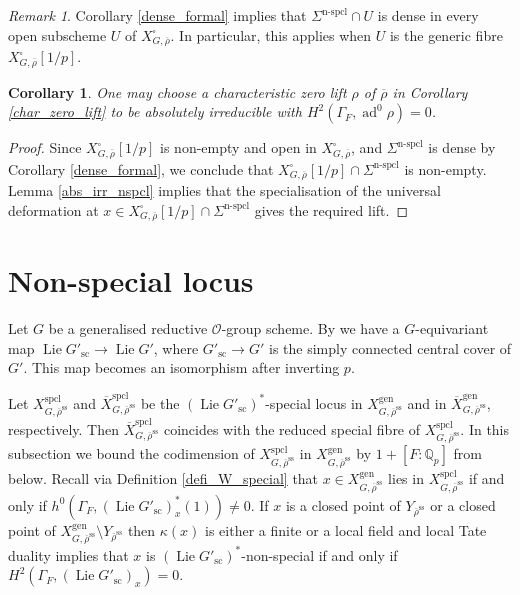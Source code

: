 \documentclass{amsart}
\newtheorem{cor}[prop]{Corollary}
\theoremstyle{definition}
\theoremstyle{remark}
\newtheorem{remar}[prop]{Remark}
\newcommand{\Qp}{\mathbb {Q}_p}
\newcommand{\OO}{\mathcal O}
\DeclareMathOperator{\ad}{ad}
\newcommand{\rhobar}{\overline{\rho}}
\newcommand{\gen}{\mathrm{gen}}
\newcommand{\Xbar}{\overline{X}}
\DeclareMathOperator{\spcl}{spcl}
\DeclareMathOperator{\nspcl}{n-spcl}
\DeclareMathOperator{\Lie}{Lie}
\newcommand{\rhobarss}{\rhobar^{\mathrm{ss}}}
\newcommand{\sic}{\operatorname{sc}}
\begin{document}
\begin{remar} Corollary \ref{dense_formal} implies that $\Sigma^{\nspcl}\cap U$ is dense in every 
open subscheme $U$ of $X^{\square}_{G, \rhobar}$. In particular, this applies when $U$ is the generic fibre $X^{\square}_{G, \rhobar}[1/p]$. 
\end{remar}

\begin{cor} One may choose a characteristic zero lift $\rho$ of $\rhobar$ in Corollary 
\ref{char_zero_lift} to be absolutely irreducible with $H^2(\Gamma_F, \ad^0 \rho)=0$.
\end{cor} 
\begin{proof} Since $X^{\square}_{G, \rhobar}[1/p]$ is non-empty  and open 
in $X^{\square}_{G, \rhobar}$, and $\Sigma^{\nspcl}$ is dense by Corollary \ref{dense_formal}, 
we conclude that $X^{\square}_{G, \rhobar}[1/p]\cap \Sigma^{\nspcl}$ is non-empty. 
Lemma \ref{abs_irr_nspcl} implies that the specialisation of the universal deformation at $x\in X^{\square}_{G, \rhobar}[1/p]\cap \Sigma^{\nspcl}$
gives the required lift. 
\end{proof}

\section{Non-special locus}\label{sec:bound_special} 
Let $G$ be a generalised reductive $\OO$-group scheme. By 
we have a $G$-equivariant map $\Lie G'_{\sic}\rightarrow \Lie G'$, where 
$G'_{\sic}\rightarrow G'$ is the simply connected central cover of $G'$. 
This map becomes an isomorphism after inverting $p$.  

Let $X^{\spcl}_{G, \rhobarss}$ and $\Xbar^{\spcl}_{G,\rhobarss}$ be the $(\Lie G'_{\sic})^{\ast}$-special locus in $X^{\gen}_{G, \rhobarss}$ and in $\Xbar^{\gen}_{G, \rhobarss}$, respectively. Then $\Xbar^{\spcl}_{G,\rhobarss}$ coincides with the reduced special fibre of $X^{\spcl}_{G, \rhobarss}$. In this subsection we bound the codimension of $X^{\spcl}_{G, \rhobarss}$ in 
$X^{\gen}_{G,\rhobarss}$ by $1+[F:\Qp]$ from below.  Recall via Definition 
\ref{defi_W_special} that $x\in X^{\gen}_{G,\rhobarss}$
lies in $X^{\spcl}_{G, \rhobarss}$ if and only if $h^0(\Gamma_F, (\Lie G'_{\sic})^{\ast}_x(1))\neq 0$.
If $x$ is a closed point of $Y_{\rhobarss}$ or a closed point of $X^{\gen}_{G,\rhobarss}\setminus 
Y_{\rhobarss}$ then $\kappa(x)$ is either a finite or a local field and local Tate duality implies that $x$ is $(\Lie G'_{\sic})^{\ast}$-non-special
if and only if $H^2(\Gamma_F, (\Lie G'_{\sic})_x)=0$. 
\end{document}
